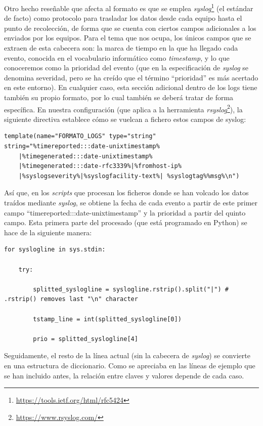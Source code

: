 Otro hecho reseñable que afecta al formato es que se emplea \emph{syslog}\footnote{\url{https://tools.ietf.org/html/rfc5424}} (el estándar de facto)
como protocolo para trasladar los datos desde cada equipo hasta el punto de recolección,
de forma que se cuenta con ciertos campos adicionales a los enviados por los equipos.
Para el tema que nos ocupa, los únicos campos que se extraen de esta cabecera son:
la marca de tiempo en la que ha llegado cada evento, conocida en el vocabulario informático como \emph{timestamp}, y lo que conoceremos como la prioridad del evento
(que en la especificación de \emph{syslog} se denomina severidad, pero se ha creído que el término ``prioridad'' es más acertado en este entorno).
En cualquier caso, esta sección adicional dentro de los logs tiene también su propio formato, por lo cual también se deberá tratar de forma específica.
En nuestra configuración (que aplica a la herramienta \emph{rsyslog}\footnote{\url{https://www.rsyslog.com/}}),
la siguiente directiva establece cómo se vuelcan a fichero estos campos de syslog:

\begin{verbatim}
template(name="FORMATO_LOGS" type="string"
string="%timereported:::date-unixtimestamp%
    |%timegenerated:::date-unixtimestamp%
    |%timegenerated:::date-rfc3339%|%fromhost-ip%
    |%syslogseverity%|%syslogfacility-text%| %syslogtag%%msg%\n")
\end{verbatim}

Así que, en los \emph{scripts} que procesan los ficheros donde se han volcado los datos traídos mediante \emph{syslog},
se obtiene la fecha de cada evento a partir de este primer campo ``timereported:::date-unixtimestamp'' y la prioridad a partir del quinto campo.
Esta primera parte del procesado (que está programado en Python) se hace de la siguiente manera:

\begin{verbatim}
for syslogline in sys.stdin:

    try:

        splitted_syslogline = syslogline.rstrip().split("|") # .rstrip() removes last "\n" character

        tstamp_line = int(splitted_syslogline[0])

        prio = splitted_syslogline[4]
\end{verbatim}

Seguidamente, el resto de la línea actual (sin la cabecera de \emph{syslog}) se convierte en una estructura de diccionario.
Como se apreciaba en las líneas de ejemplo que se han incluido antes, la relación entre claves y valores depende de cada caso.

